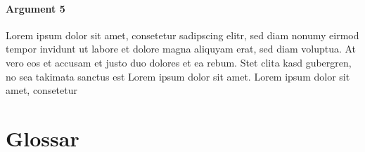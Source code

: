 \documentclass[10pt,a4paper]{article} %
\begin{document}
\begin{multicols}{2}
\subsection*{Argument 5}
Lorem ipsum dolor sit amet, consetetur sadipscing elitr, sed diam nonumy eirmod tempor invidunt ut labore et dolore magna aliquyam erat, sed diam voluptua. At vero eos et accusam et justo duo dolores et ea rebum. Stet clita kasd gubergren, no sea takimata sanctus est Lorem ipsum dolor sit amet. Lorem ipsum dolor sit amet, consetetur 
 
\end{multicols}

\newpage



\part*{Glossar}
\end{document}
